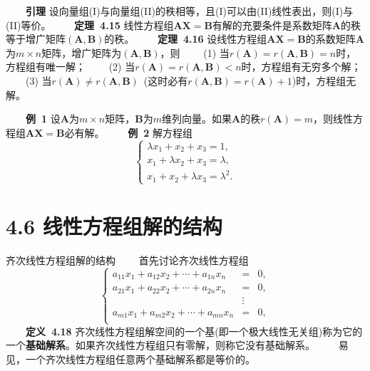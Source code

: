 \documentclass[compress,mathserif,cjk]{beamer}
\theoremstyle{remark}
\numberwithin{equation}{section}
\newcommand{\hei}{\bf}      %
\begin{document}
\begin{CJK}{UTF8}{gbsn}
\begin{frame}
 \ \ \ \ {\hei 引理} 设向量组(I)与向量组(II)的秩相等，且(I)可以由(II)线性表出，则(I)与(II)等价。
 \pause\vskip 10pt
 \ \ \ \ {\hei 定理~4.15} 线性方程组$\bm{AX}=\bm B$有解的充要条件是系数矩阵$\bm A$的秩等于增广矩阵$(\bm A,\bm B)$的秩。
 \pause\vskip 10pt
 \ \ \ \ {\hei 定理~4.16} 设线性方程组$\bm{AX}=\bm B$的系数矩阵$\bm A$为$m\times n$矩阵，增广矩阵为$(\bm A,\bm B)$，则
 \vskip 5pt
 \ \ \ \ (1) 当$r(\bm A)=r(\bm A,\bm B)=n$时，方程组有唯一解；
 \vskip 5pt
 \ \ \ \ (2)  当$r(\bm A)=r(\bm A,\bm B)<n$时，方程组有无穷多个解；
 \vskip 5pt
 \ \ \ \ (3)  当$r(\bm A)\neq r(\bm A,\bm B)$~(这时必有$r(\bm A,\bm B)=r(\bm A)+1$)时，方程组无解。
\end{frame}

\begin{frame}
 \ \ \ \ {\hei 例~1} 设$\bm A$为$m\times n$矩阵，$\bm B$为$m$维列向量。如果$\bm A$的秩$r(\bm A)=m$，则线性方程组$\bm{AX}=\bm B$必有解。
 \pause\vskip 10pt
 \ \ \ \ {\hei 例~2} 解方程组
 $$\left\{\begin{array}{l}
 \lambda x_1+x_2+x_3=1,\\x_1+\lambda x_2+x_3=\lambda,\\x_1+x_2+\lambda x_3=\lambda^2.
 \end{array}\right.$$


\end{frame}


\section[4.6]{4.6 线性方程组解的结构}

\setcounter{section}{4}
\setcounter{equation}{17}
\begin{frame}{齐次线性方程组解的结构}
\ \ \ \ 首先讨论齐次线性方程组
 \begin{equation}\label{e418}
 \left\{\begin{array}{rcl}
 a_{11}x_1+a_{12}x_2+\cdots+a_{1n}x_n&=&0,\\
 a_{21}x_1+a_{22}x_2+\cdots+a_{2n}x_n&=&0,\\
 &\vdots&\\
 a_{m1}x_1+a_{m2}x_2+\cdots+a_{mn}x_n&=&0,\\
 \end{array}\right.
 \end{equation}
 \pause
 \ \ \ \ {\hei 定义~4.18} 齐次线性方程组解空间的一个基(即一个极大线性无关组)称为它的一个{\hei 基础解系}。如果齐次线性方程组只有零解，则称它没有基础解系。
 \pause\vskip 10pt
 \ \ \ \ 易见，一个齐次线性方程组任意两个基础解系都是等价的。
\end{frame}


\end{CJK}
\end{document}
